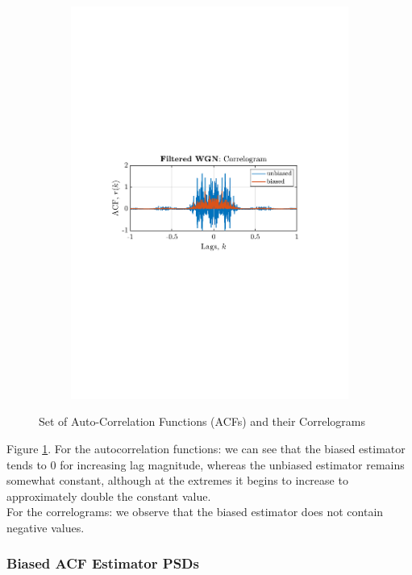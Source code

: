 \documentclass[12pt]{article}
\begin{document}
\begin{figure}[H]
\begin{subfigure}{0.49\textwidth}
			\includegraphics[trim={2.2cm 11.2cm 3.15cm  11.2cm}, clip, width=\textwidth]{../MATLAB/figures/q1_3a_fig06.pdf} 
		\end{subfigure}
		\captionsetup{justification=centering}
		\caption{Set of Auto-Correlation Functions (ACFs) and their Correlograms}
		\label{fig: 1-3a}
	\end{figure}
	
	Figure \ref{fig: 1-3a}. For the autocorrelation functions: we can see that the biased estimator tends to 0 for increasing lag magnitude, whereas the unbiased estimator remains somewhat constant, although at the extremes it begins to increase to approximately double the constant value.\\
	For the correlograms: we observe that the biased estimator does not contain negative values.
	
	\subsubsection{Biased ACF Estimator PSDs}
\end{document}
